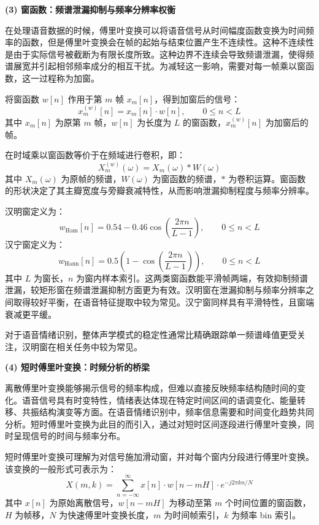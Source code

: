 \textbf{(3) 窗函数：频谱泄漏抑制与频率分辨率权衡}

在处理语音数据的时候，傅里叶变换可以将语音信号从时间幅度函数变换为时间频率的函数，但是傅里叶变换会在帧的起始与结束位置产生不连续性。这种不连续性是由于实际信号被截断为有限长度所致。这种边界不连续会导致频谱泄漏，使得频谱展宽并引起相邻频率成分的相互干扰。为减轻这一影响，需要对每一帧乘以窗函数，这一过程称为加窗。

将窗函数 $w[n]$ 作用于第 $m$ 帧 $x_m[n]$，得到加窗后的信号：
\begin{equation}
x_m^{(w)}[n] = x_m[n] \cdot w[n], \qquad 0 \le n < L
\end{equation}
其中 $x_m[n]$ 为原第 $m$ 帧，$w[n]$ 为长度为 $L$ 的窗函数，$x_m^{(w)}[n]$ 为加窗后的帧。

在时域乘以窗函数等价于在频域进行卷积，即：
\begin{equation}
X_m^{(w)}(\omega) = X_m(\omega) * W(\omega)
\end{equation}
其中 $X_m(\omega)$ 为原帧的频谱，$W(\omega)$ 为窗函数的频谱，$*$ 为卷积运算。窗函数的形状决定了其主瓣宽度与旁瓣衰减特性，从而影响泄漏抑制程度与频率分辨率。


汉明窗定义为：
\begin{equation}
w_{\mathrm{Ham}}[n] = 0.54 - 0.46\cos\left(\frac{2\pi n}{L-1}\right), \qquad 0 \le n < L
\end{equation}
汉宁窗定义为：
\begin{equation}
w_{\mathrm{Hann}}[n] = 0.5\left(1-\cos\left(\frac{2\pi n}{L-1}\right)\right), \qquad 0 \le n < L
\end{equation}
其中 $L$ 为窗长，$n$ 为窗内样本索引。这两类窗函数能平滑帧两端，有效抑制频谱泄漏，较矩形窗在频谱泄漏抑制方面更为有效。汉明窗在泄漏抑制与频率分辨率之间取得较好平衡，在语音特征提取中较为常见。汉宁窗同样具有平滑特性，且窗端衰减更平缓。

对于语音情绪识别，整体声学模式的稳定性通常比精确跟踪单一频谱峰值更受关注，汉明窗在相关任务中较为常见。



\textbf{(4) 短时傅里叶变换：时频分析的桥梁}

离散傅里叶变换能够揭示信号的频率构成，但难以直接反映频率结构随时间的变化。语音信号具有时变特性，情绪表达体现在特定时间区间的语调变化、能量转移、共振结构演变等方面。在语音情绪识别中，频率信息需要和时间变化趋势共同分析。短时傅里叶变换为此目的而引入，通过对短时区间逐段进行傅里叶变换，同时呈现信号的时间与频率分布。

短时傅里叶变换可理解为对信号施加滑动窗，并对每个窗内分段进行傅里叶变换。该变换的一般形式可表示为：
\begin{equation}
X(m,k) = \sum_{n=-\infty}^{\infty} x[n] \cdot w[n-mH] \cdot e^{-j 2\pi kn/N}
\end{equation}
其中 $x[n]$ 为原始离散信号，$w[n-mH]$ 为移动至第 $m$ 个时间位置的窗函数，$H$ 为帧移，$N$ 为快速傅里叶变换长度，$m$ 为时间帧索引，$k$ 为频率 bin 索引。

